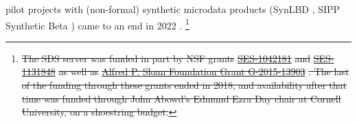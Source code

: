 \documentclass[inline]{hdsr} %
\providecommand{\DIFadd}[1]{{\protect\color{blue}\uwave{#1}}} %
\providecommand{\DIFdel}[1]{{\protect\color{red}\sout{#1}}}                      %
\providecommand{\DIFaddend}{} %
\providecommand{\DIFdelbegin}{} %
\begin{document}
\DIFadd{Long-running }\DIFaddend pilot projects with (non-formal) synthetic microdata products (SynLBD \citep{KinneyEtAl2011,us_census_bureau_synthetic_2011,vilhuber_codebook_2013}, SIPP Synthetic Beta \citep{Benedettoetal_2013,us_census_bureau_sipp_2015,reeder_codebook_2018}) came to an end in 2022 \citep{vilhuber_end_2022}. \DIFdelbegin \footnote{\DIFdel{The SDS server was funded in part by NSF grants }\href{http://www.nsf.gov/awardsearch/showAward.do?AwardNumber=1042181}{\DIFdel{SES-1042181}} %
\DIFdel{and }\href{http://www.nsf.gov/awardsearch/showAward.do?AwardNumber=1131848}{\DIFdel{SES-1131848}} %
\DIFdel{as well as }\href{https://sloan.org/grant-detail/6845}{\DIFdel{Alfred P. Sloan Foundation Grant G-2015-13903}}%
\DIFdel{. The last of the funding through these grants ended in 2018, and availability after that time was funded through John Abowd's Edmund Ezra Day chair at Cornell University, on a shoestring budget.}} %
\addtocounter{footnote}{-1}%
\end{document}
